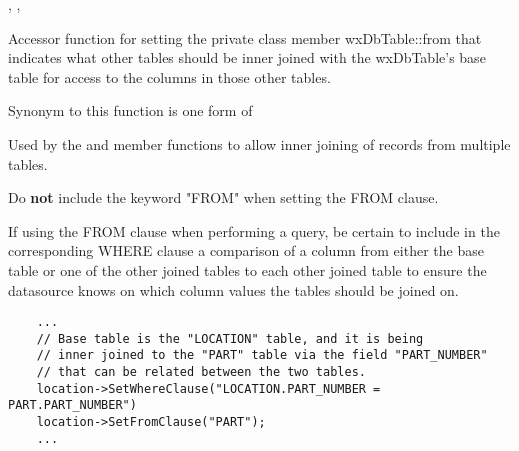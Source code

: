 
,
,

\label{wxdbtablesetfromclause}


Accessor function for setting the private class member wxDbTable::from
that indicates what other tables should be inner joined with the wxDbTable's
base table for access to the columns in those other tables.

Synonym to this function is one form of 




Used by the  and
 member functions to allow inner
joining of records from multiple tables.

Do {\bf not} include the keyword "FROM" when setting the FROM clause.

If using the FROM clause when performing a query, be certain to include in
the corresponding WHERE clause a comparison of a column from either the base
table or one of the other joined tables to each other joined table to ensure
the datasource knows on which column values the tables should be joined on.


\begin{verbatim}
    ...
    // Base table is the "LOCATION" table, and it is being
    // inner joined to the "PART" table via the field "PART_NUMBER"
    // that can be related between the two tables.
    location->SetWhereClause("LOCATION.PART_NUMBER = PART.PART_NUMBER")
    location->SetFromClause("PART");
    ...
\end{verbatim}

